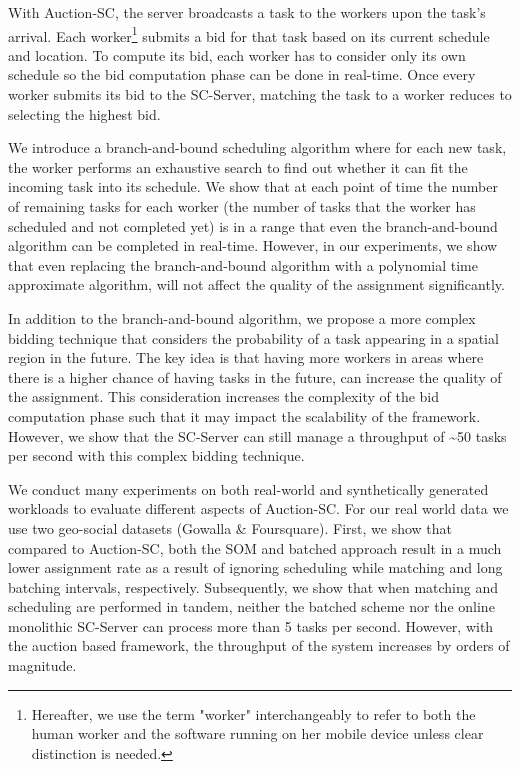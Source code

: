 With Auction-SC, the server broadcasts a task to the workers upon the task's arrival. Each worker\footnote{Hereafter, we use the term "worker" interchangeably to refer to both the human worker and the software running on her mobile device unless clear distinction is needed.} submits a bid for that task based on its current schedule and location. To compute its bid, each worker has to consider only its own schedule so the bid computation phase can be done in real-time. Once every worker submits its bid to the SC-Server, matching the task to a worker reduces to selecting the highest bid.

We introduce a branch-and-bound scheduling algorithm where for each new task, the worker performs an exhaustive search to find out whether it can fit the incoming task into its schedule. We show that at each point of time the number of remaining tasks for each worker (the number of tasks that the worker has scheduled and not completed yet) is in a range that even the branch-and-bound algorithm can be completed in real-time. However, in our experiments, we show that even replacing the branch-and-bound algorithm with a polynomial time approximate algorithm, will not affect the quality of the assignment significantly.

In addition to the branch-and-bound algorithm, we propose a more complex bidding technique that considers the probability of a task appearing in a spatial region in the future. The key idea is that having more workers in areas where there is a higher chance of having tasks in the future, can increase the quality of the assignment. This consideration increases the complexity of the bid computation phase such that it may impact the scalability of the framework. However, we show that the SC-Server can still manage a throughput of \textasciitilde 50 tasks per second with this complex bidding technique.

We conduct many experiments on both real-world and synthetically generated workloads to evaluate different aspects of Auction-SC. For our real world data we use two geo-social datasets (Gowalla \& Foursquare). First, we show that compared to Auction-SC, both the SOM and batched approach result in a much lower assignment rate as a result of ignoring scheduling while matching and long batching intervals, respectively. Subsequently, we show that when matching and scheduling are performed in tandem, neither the batched scheme nor the online monolithic SC-Server can process more than 5 tasks per second. However, with the auction based framework, the throughput of the system increases by orders of magnitude.

